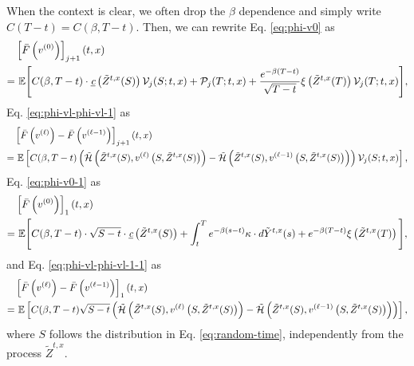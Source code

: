 \documentclass[11pt]{article}
\theoremstyle{definition}
\theoremstyle{plain}
\newcommand{\E}{\mathbb{E}}
\newcommand{\cH}{{\cal H}}
\begin{document}
When the context is clear, we often drop the $\beta$ dependence and simply write $C(T-t) = C(\beta, T-t)$.
Then, we can rewrite Eq. \eqref{eq:phi-v0} as 
\begin{align}
& \left[\bar F\left(v^{(0)}\right)\right]_{j+1}(t,x) \nonumber \\
=& \ \E\Bigg[ C(\beta, T-t)\cdot \underbar{\em c}\left(\tilde{Z}^{t,x}(S)\right) \mathcal{V}_j(S; t,x)
+ \mathcal{P}_j(T; t,x) + \frac{e^{-\beta (T-t)}}{\sqrt{T-t}}\xi \left(\tilde{Z}^{t,x}(T)\right)\mathcal{V}_j(T; t,x)\Bigg], 
\label{eq:v0-ex}
\end{align}
Eq. \eqref{eq:phi-vl-phi-vl-1} as 
\begin{align}
& \left[\bar F\left(v^{(\ell)}\right)-\bar F\left(v^{(\ell-1)}\right)\right]_{j+1}(t, x) \nonumber \\
=& \ \E\left[C(\beta, T-t)\left(\tilde \cH\left(\tilde{Z}^{t,x}(S), v^{(\ell)}\left(S,\tilde{Z}^{t,x}(S)\right)\right) - \tilde \cH\left(\tilde{Z}^{t,x}(S), v^{(\ell-1)}\left(S,\tilde{Z}^{t,x}(S)\right)\right) \right) \mathcal{V}_j (S; t, x)\right], \label{eq:vl-vl-1-ex}
\end{align}
Eq. \eqref{eq:phi-v0-1} as 
\begin{align}
& \left[\bar F\left(v^{(0)}\right)\right]_1(t,x) \nonumber \\
=& \ \E\Bigg[ C(\beta, T-t)\cdot \sqrt{S-t}\cdot \underbar{\em c}\left(\tilde{Z}^{t,x}(S)\right) 
+ \int_t^T e^{-\beta (s-t)}\kappa\cdot d\tilde Y^{t,x}(s) + e^{-\beta (T-t)}\xi \left(\tilde{Z}^{t,x}(T)\right)\Bigg], 
\label{eq:v0-ex-1}
\end{align}
and Eq. \eqref{eq:phi-vl-phi-vl-1-1} as
\begin{align}
& \left[\bar F\left(v^{(\ell)}\right)-\bar F\left(v^{(\ell-1)}\right)\right]_1(t, x) \nonumber \\
=& \ \E\left[C(\beta, T-t)\sqrt{S-t}\left(\tilde \cH\left(\tilde{Z}^{t,x}(S), v^{(\ell)}\left(S,\tilde{Z}^{t,x}(S)\right)\right) - \tilde \cH\left(\tilde{Z}^{t,x}(S), v^{(\ell-1)}\left(S,\tilde{Z}^{t,x}(S)\right)\right) \right)\right], \label{eq:vl-vl-1-ex-1}
\end{align}
where $S$ follows the distribution in Eq. \eqref{eq:random-time}, 
independently from the process $\tilde{Z}^{t,x}$. 
\end{document}
